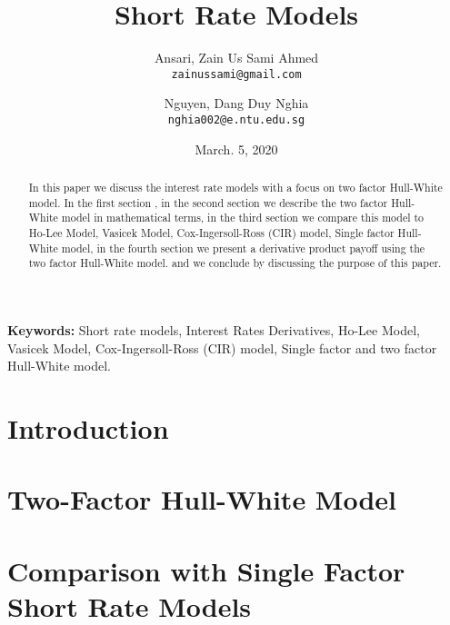 \documentclass{article}
\begin{document}
\nocite{*} %

\title{Short Rate Models}

\author{
  Ansari, Zain Us Sami Ahmed\\
  \texttt{zainussami@gmail.com}
  \and
  Nguyen, Dang Duy Nghia \\
  \texttt{nghia002@e.ntu.edu.sg}  
  }

\date{March. 5, 2020} %

\maketitle

\noindent
\textbf{Keywords:} Short rate models, Interest Rates Derivatives,  Ho-Lee Model, Vasicek Model, Cox-Ingersoll-Ross (CIR) model, Single factor and two factor Hull-White model.



\begin{abstract}
In this paper we discuss the interest rate models with a focus on two factor Hull-White model.  In the first section , in the second section we describe the two factor Hull-White model in mathematical terms, in the third section we compare this model to Ho-Lee Model, Vasicek Model, Cox-Ingersoll-Ross (CIR) model, Single factor Hull-White model,  in the fourth section we present a derivative product payoff using the two factor Hull-White model. and we conclude by discussing the purpose of this paper.  
\end{abstract}

\section{Introduction
}




\section{Two-Factor Hull-White Model 
}


\section{Comparison with Single Factor Short Rate Models
}
\end{document}
